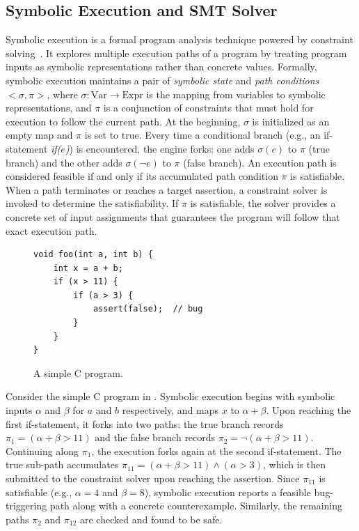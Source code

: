 \subsection{Symbolic Execution and SMT Solver}
Symbolic execution is a formal program analysis technique powered by constraint solving~\cite{baldoni2018survey}. It explores multiple execution paths of a program by treating program inputs as symbolic representations rather than concrete values. Formally, symbolic execution maintains a pair of \textit{symbolic state} and \textit{path conditions} $<\sigma, \pi>$, where $\sigma: \text{Var} \to \text{Expr}$ is the mapping from variables to symbolic representations, and $\pi$ is a conjunction of constraints that must hold for execution to follow the current path. At the beginning, $\sigma$ is initialized as an empty map and $\pi$ is set to $\text{true}$. Every time a conditional branch (e.g., an if-statement \textit{if($e$)}) is encountered, the engine forks: one adds $\sigma(e)$ to $\pi$ (true branch) and the other adds $\sigma(\lnot e)$ to $\pi$ (false branch). An execution path is considered feasible if and only if its accumulated path condition $\pi$ is satisfiable. When a path terminates or reaches a target assertion, a constraint solver is invoked to determine the satisfiability. If $\pi$ is satisfiable, the solver provides a concrete set of input assignments that guarantees the program will follow that exact execution path.


\begin{figure}[htbp]
    \centering
    \begin{minipage}{0.8\textwidth} 
        \begin{verbatim}
void foo(int a, int b) {
    int x = a + b;
    if (x > 11) {
        if (a > 3) {
            assert(false);  // bug
        }
    }
}
        \end{verbatim}
    \end{minipage}
    \caption{A simple C program.}
    \label{fig:c}
\end{figure}

Consider the simple C program in . Symbolic execution begins with symbolic inputs $\alpha$ and $\beta$ for $a$ and $b$ respectively, and maps $x$ to $\alpha + \beta$. Upon reaching the first if-statement, it forks into two paths: the true branch records $\pi_1 = (\alpha + \beta > 11)$ and the false branch records $\pi_2 = \lnot(\alpha + \beta > 11)$. Continuing along $\pi_1$, the execution forks again at the second if-statement. The true sub-path accumulates $\pi_{11} = (\alpha + \beta > 11) \land (\alpha > 3)$, which is then submitted to the constraint solver upon reaching the assertion. Since $\pi_{11}$ is satisfiable (e.g., $\alpha = 4$ and $\beta = 8$), symbolic execution reports a feasible bug-triggering path along with a concrete counterexample. Similarly, the remaining paths $\pi_2$ and $\pi_{12}$ are checked and found to be safe. 

